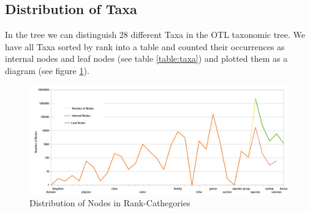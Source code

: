     \subsection{Distribution of Taxa}
      In the tree we can distinguish 28 different Taxa in the OTL taxonomic tree. We have all Taxa 
        sorted by rank into a table and counted their occurrences as internal nodes and leaf nodes
        (see table \ref{table:taxa}) and plotted them as a diagram (see figure \ref{fig:taxa}).
    \begin{figure}[h!]
      \centering
      \includegraphics[width=\textwidth]{Figures/TaxaTable2.JPG}
      \caption{Distribution of Nodes in Rank-Cathegories}
      \label{fig:taxa}
    \end{figure}

